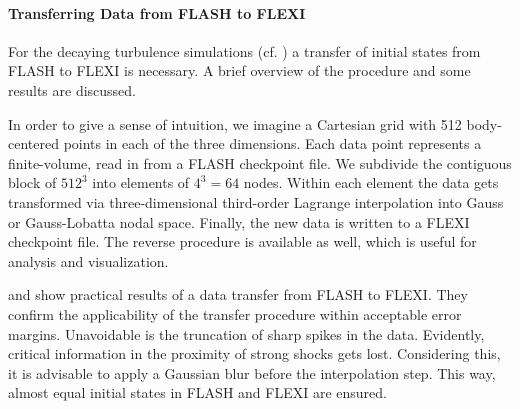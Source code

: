
\paragraph{Transferring Data from \textsc{FLASH} to \textsc{FLEXI}}
For the decaying turbulence simulations (cf. ) a transfer of
initial states from FLASH to FLEXI is necessary. A brief overview of the
procedure and some results are discussed.

In order to give a sense of intuition, we imagine a Cartesian grid with 512
body-centered points in each of the three dimensions. Each data point
represents a finite-volume, read in from a FLASH checkpoint file. We subdivide
the contiguous block of $512^3$ into elements of $4^3 = 64$ nodes.  Within each
element the data gets transformed via three-dimensional third-order Lagrange
interpolation into Gauss or Gauss-Lobatta nodal space. Finally, the new data is
written to a FLEXI checkpoint file. The reverse procedure is available as well,
which is useful for analysis and visualization. 


 and
 show practical results of a data
transfer from FLASH to FLEXI. They confirm the applicability of the transfer
procedure within acceptable error margins. Unavoidable is the truncation of
sharp spikes in the data. Evidently, critical information in the proximity of
strong shocks gets lost. Considering this, it is advisable to apply a
Gaussian blur before the interpolation step. This way, almost equal initial
states in FLASH and FLEXI are ensured.

